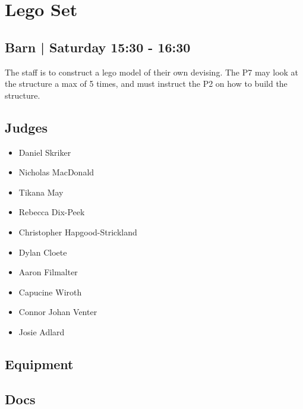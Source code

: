 \documentclass[10pt]{article}
\begin{document}
		\begin{minipage}{\linewidth}
		\setcounter{section}{10}
	\section{Lego Set }
	\subsection*{Barn | Saturday 15:30 - 16:30}

	The staff is to construct a lego model of their own devising. The P7 may look at the structure a max of 5 times, and must instruct the P2 on how to build the structure. 

	\begin{multicols}{2}
	\subsection*{\faUsers \: Judges}
	\begin{itemize}
			\item Daniel Skriker
			\item Nicholas MacDonald
			\item Tikana May
			\item Rebecca Dix-Peek
			\item Christopher Hapgood-Strickland
			\item Dylan Cloete
			\item Aaron Filmalter
			\item Capucine Wiroth
			\item Connor Johan Venter
			\item Josie Adlard
		\end{itemize}
	\columnbreak
	\subsection*{\faWrench \: Equipment}
	        \vfill\null
        \subsection*{\faFile \: Docs}
     	\end{multicols}


	\vspace{1cm}
	\end{minipage}
\end{document}
